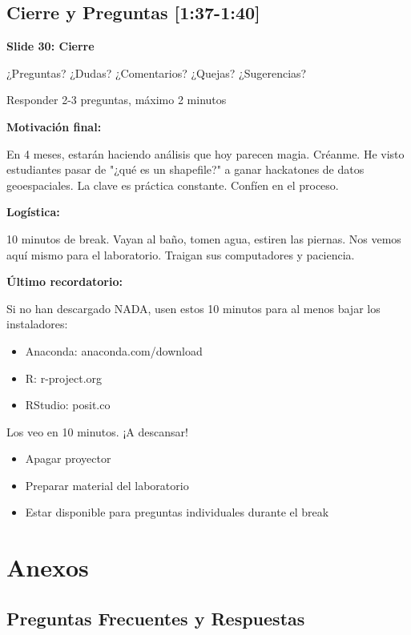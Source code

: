 \documentclass[11pt,a4paper]{article}
\newcommand{\tiempo}[1]{\textcolor{timecolor}{\faIcon{clock} \textbf{[#1]}}}
\newcommand{\decir}[1]{\begin{tcolorbox}[colback=blue!5,colframe=usachblue,title={\faIcon{microphone} DECIR}]#1\end{tcolorbox}}
\newcommand{\hacer}[1]{\begin{tcolorbox}[colback=green!5,colframe=green!50!black,title={\faIcon{hand-point-right} HACER}]#1\end{tcolorbox}}
\begin{document}
\subsection{Cierre y Preguntas \tiempo{1:37-1:40}}

\textbf{Slide 30: Cierre}

\decir{¿Preguntas? ¿Dudas? ¿Comentarios? ¿Quejas? ¿Sugerencias?}

\hacer{Responder 2-3 preguntas, máximo 2 minutos}

\textbf{Motivación final:}

\decir{En 4 meses, estarán haciendo análisis que hoy parecen magia. Créanme. He visto estudiantes pasar de "¿qué es un shapefile?" a ganar hackatones de datos geoespaciales. La clave es práctica constante. Confíen en el proceso.}

\textbf{Logística:}

\decir{10 minutos de break. Vayan al baño, tomen agua, estiren las piernas. Nos vemos aquí mismo para el laboratorio. Traigan sus computadores y paciencia.}

\textbf{Último recordatorio:}

\decir{Si no han descargado NADA, usen estos 10 minutos para al menos bajar los instaladores:
\begin{itemize}
    \item Anaconda: anaconda.com/download
    \item R: r-project.org
    \item RStudio: posit.co
\end{itemize}

Los veo en 10 minutos. ¡A descansar!}

\hacer{
\begin{itemize}
    \item Apagar proyector
    \item Preparar material del laboratorio
    \item Estar disponible para preguntas individuales durante el break
\end{itemize}
}

\newpage

\section{Anexos}

\subsection{Preguntas Frecuentes y Respuestas}
\end{document}
